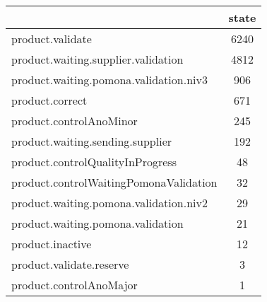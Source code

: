 \begin{tabular}{lc}
\toprule
{} &  state \\
\midrule
product.validate                       &   6240 \\
product.waiting.supplier.validation    &   4812 \\
product.waiting.pomona.validation.niv3 &    906 \\
product.correct                        &    671 \\
product.controlAnoMinor                &    245 \\
product.waiting.sending.supplier       &    192 \\
product.controlQualityInProgress       &     48 \\
product.controlWaitingPomonaValidation &     32 \\
product.waiting.pomona.validation.niv2 &     29 \\
product.waiting.pomona.validation      &     21 \\
product.inactive                       &     12 \\
product.validate.reserve               &      3 \\
product.controlAnoMajor                &      1 \\
\bottomrule
\end{tabular}

